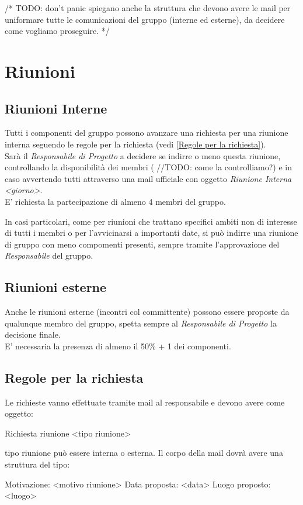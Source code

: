 \documentclass{scalatekids-article}
\begin{document}
/*
	TODO: don't panic spiegano anche la struttura che devono avere le mail per uniformare tutte le comunicazioni del gruppo (interne ed esterne), da decidere come vogliamo proseguire.
*/

\section{Riunioni}

\subsection{Riunioni Interne}
Tutti i componenti del gruppo possono avanzare una richiesta per una riunione interna seguendo le regole per la richiesta (vedi \ref{Regole per la richiesta}).\\
Sarà il \textit{Responsabile di Progetto} a decidere se indirre o meno questa riunione, controllando la disponibilità dei membri ( //TODO: come la controlliamo?) e in caso avvertendo tutti attraverso una mail ufficiale con oggetto \textit{Riunione Interna <giorno>}.\\
E' richiesta la partecipazione di almeno 4 membri del gruppo.

In casi particolari, come per riunioni che trattano specifici ambiti non di interesse di tutti i membri o per l'avvicinarsi a importanti date, si può indirre una riunione di gruppo con meno compomenti presenti, sempre tramite l'approvazione del \textit{Responsabile} del gruppo.

\subsection{Riunioni esterne}
Anche le riunioni esterne (incontri col committente) possono essere proposte da qualunque membro del gruppo, spetta sempre al \textit{Responsabile di Progetto} la decisione finale.\\
E' necessaria la presenza di almeno il 50\% + 1 dei componenti.

\subsection{Regole per la richiesta}
Le richieste vanno effettuate tramite mail al responsabile e devono avere come oggetto:
\begin{center}
Richiesta riunione <tipo riunione>
\end{center}
tipo riunione può essere interna o esterna.
Il corpo della mail dovrà avere una struttura del tipo:
\begin{center}
Motivazione: <motivo riunione>
Data proposta: <data>
Luogo proposto: <luogo>
\end{center}
\end{document}
